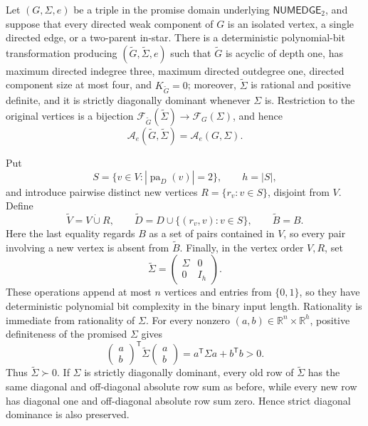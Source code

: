 Let \((G,\Sigma,e)\) be a triple in the promise domain underlying \(\mathsf{NUMEDGE}_2\), and suppose that every directed weak component of \(G\) is an isolated vertex, a single directed edge, or a two-parent in-star.  There is a deterministic polynomial-bit transformation producing \((\widetilde G,\widetilde\Sigma,e)\) such that \(\widetilde G\) is acyclic of depth one, has maximum directed indegree three, maximum directed outdegree one, directed component size at most four, and \(K_{\widetilde G}=0\); moreover, \(\widetilde\Sigma\) is rational and positive definite, and it is strictly diagonally dominant whenever \(\Sigma\) is.  Restriction to the original vertices is a bijection \(\mathcal F_{\widetilde G}(\widetilde\Sigma)\to\mathcal F_G(\Sigma)\), and hence
\[
\mathcal A_e(\widetilde G,\widetilde\Sigma)=\mathcal A_e(G,\Sigma).
\]

Put
\[
S=\{v\in V:|\operatorname{pa}_D(v)|=2\},\qquad h=|S|,
\]
and introduce pairwise distinct new vertices \(R=\{r_v:v\in S\}\), disjoint from \(V\).  Define
\[
\widetilde V=V\mathbin{\dot\cup}R,
\qquad
\widetilde D=D\cup\{(r_v,v):v\in S\},
\qquad
\widetilde B=B.
\]
Here the last equality regards \(B\) as a set of pairs contained in \(V\), so every pair involving a new vertex is absent from \(\widetilde B\).  Finally, in the vertex order \(V,R\), set
\[
\widetilde\Sigma=
\begin{pmatrix}
\Sigma&0\\
0&I_h
\end{pmatrix}.
\]
These operations append at most \(n\) vertices and entries from \(\{0,1\}\), so they have deterministic polynomial bit complexity in the binary input length.  Rationality is immediate from rationality of \(\Sigma\).  For every nonzero \((a,b)\in\mathbb R^n\times\mathbb R^h\), positive definiteness of the promised \(\Sigma\) gives
\[
\begin{pmatrix}a\\b\end{pmatrix}^{\!\mathsf T}
\widetilde\Sigma
\begin{pmatrix}a\\b\end{pmatrix}
=a^{\mathsf T}\Sigma a+b^{\mathsf T}b>0.
\]
Thus \(\widetilde\Sigma\succ0\).  If \(\Sigma\) is strictly diagonally dominant, every old row of \(\widetilde\Sigma\) has the same diagonal and off-diagonal absolute row sum as before, while every new row has diagonal one and off-diagonal absolute row sum zero.  Hence strict diagonal dominance is also preserved.

